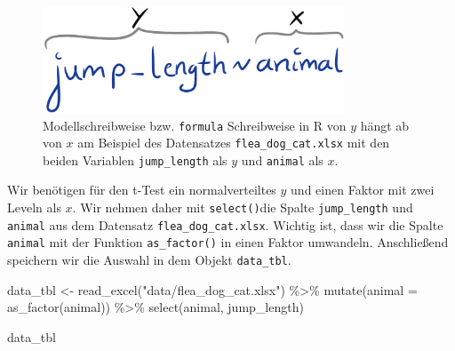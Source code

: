 \documentclass[
  letterpaper,
  DIV=11,
  oneside]{scrreport}
\newenvironment{Shaded}{\begin{snugshade}}{\end{snugshade}}
\newcommand{\AttributeTok}[1]{\textcolor[rgb]{0.40,0.45,0.13}{#1}}
\newcommand{\FunctionTok}[1]{\textcolor[rgb]{0.28,0.35,0.67}{#1}}
\newcommand{\NormalTok}[1]{\textcolor[rgb]{0.00,0.23,0.31}{#1}}
\newcommand{\OtherTok}[1]{\textcolor[rgb]{0.00,0.23,0.31}{#1}}
\newcommand{\SpecialCharTok}[1]{\textcolor[rgb]{0.37,0.37,0.37}{#1}}
\newcommand{\StringTok}[1]{\textcolor[rgb]{0.13,0.47,0.30}{#1}}
\begin{document}
\begin{figure}

{\centering \includegraphics[width=0.8\textwidth,height=\textheight]{./images/statistical_modeling_1.png}

}

\caption{\label{fig-ttest-1}Modellschreibweise bzw. \texttt{formula}
Schreibweise in R von \(y\) hängt ab von \(x\) am Beispiel des
Datensatzes \texttt{flea\_dog\_cat.xlsx} mit den beiden Variablen
\texttt{jump\_length} als \(y\) und \texttt{animal} als \(x\).}

\end{figure}


Wir benötigen für den t-Test ein normalverteiltes \(y\) und einen Faktor
mit zwei Leveln als \(x\). Wir nehmen daher mit \texttt{select()}die
Spalte \texttt{jump\_length} und \texttt{animal} aus dem Datensatz
\texttt{flea\_dog\_cat.xlsx}. Wichtig ist, dass wir die Spalte
\texttt{animal} mit der Funktion \texttt{as\_factor()} in einen Faktor
umwandeln. Anschließend speichern wir die Auswahl in dem Objekt
\texttt{data\_tbl}.

\begin{Shaded}
\begin{Highlighting}[]
\NormalTok{data\_tbl }\OtherTok{\textless{}{-}} \FunctionTok{read\_excel}\NormalTok{(}\StringTok{"data/flea\_dog\_cat.xlsx"}\NormalTok{) }\SpecialCharTok{\%\textgreater{}\%} 
  \FunctionTok{mutate}\NormalTok{(}\AttributeTok{animal =} \FunctionTok{as\_factor}\NormalTok{(animal)) }\SpecialCharTok{\%\textgreater{}\%} 
  \FunctionTok{select}\NormalTok{(animal, jump\_length)}

\NormalTok{data\_tbl}
\end{Highlighting}
\end{Shaded}
\end{document}

